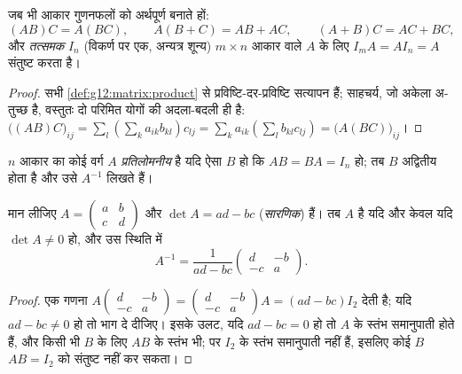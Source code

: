 \begin{proposition}[आव्यूह-बीजगणित के नियम]\label{prop:g12:matrix:rules}
जब भी आकार गुणनफलों को अर्थपूर्ण बनाते हों:
\[
(AB)C = A(BC), \qquad A(B + C) = AB + AC, \qquad (A+B)C = AC + BC,
\]
और \emph{तत्समक } $I_n$ (विकर्ण पर एक, अन्यत्र शून्य) $m \times n$ आकार वाले
$A$ के लिए $I_m A = A I_n = A$ संतुष्ट करता है।
\end{proposition}

\begin{proof}
सभी \cref{def:g12:matrix:product} से प्रविष्टि-दर-प्रविष्टि सत्यापन हैं; साहचर्य, जो अकेला अ-तुच्छ है,
वस्तुतः दो परिमित योगों की अदला-बदली ही है: $\bigl((AB)C\bigr)_{ij} = \sum_l \left(\sum_k a_{ik}b_{kl}\right) c_{lj}
= \sum_k a_{ik} \left(\sum_l b_{kl} c_{lj}\right)
= \bigl(A(BC)\bigr)_{ij}$।
\end{proof}

\begin{definition}[प्रतिलोम]\label{def:g12:matrix:inverse}
$n$ आकार का कोई वर्ग  $A$ \emph{प्रतिलोमनीय}
है यदि ऐसा  $B$ हो कि $AB = BA = I_n$ हो; तब $B$ अद्वितीय होता है और उसे $A^{-1}$
लिखते हैं।
\end{definition}

\begin{proposition}[$2\times2$ आव्यूह का प्रतिलोम]\label{prop:g12:matrix:inverse2x2}
मान लीजिए $A = \begin{pmatrix} a & b\\ c & d\end{pmatrix}$ और $\det A = ad - bc$ (\emph{सारणिक}) हैं। तब $A$
 है यदि और केवल यदि $\det A \neq 0$ हो, और उस स्थिति में
\[
A^{-1} = \frac{1}{ad - bc}\begin{pmatrix} d & -b\\ -c & a\end{pmatrix}.
\]
\end{proposition}

\begin{proof}
एक गणना $A \begin{pmatrix} d & -b\\ -c & a\end{pmatrix}
= \begin{pmatrix} d & -b\\ -c & a\end{pmatrix} A = (ad - bc) I_2$ देती है; यदि $ad - bc \neq 0$ हो तो भाग दे दीजिए। इसके उलट, यदि $ad - bc = 0$ हो तो
$A$ के स्तंभ समानुपाती होते हैं, और किसी भी $B$ के लिए $AB$ के स्तंभ भी;
पर $I_2$ के स्तंभ समानुपाती नहीं हैं, इसलिए कोई $B$ $AB = I_2$ को संतुष्ट नहीं कर
सकता।
\end{proof}

